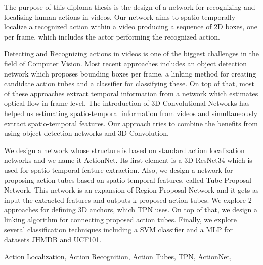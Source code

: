 \documentclass[10pt, twoside, a4paper]{cvsp-thesis}
\newcommand{\en}{\selectlanguage{english}}
\newcommand{\gr}{\selectlanguage{greek}}
\begin{document}
\en
\begin{abstracteng}

  The purpose of this diploma thesis is the design of a network for recognizing and localising human actions in videos.
  Our network aims to spatio-temporally localize a recognized action within a video
  producing a sequence of 2D boxes, one per frame, which includes the actor
  performing the recognized action. \par

  Detecting and Recognizing actions in videos is one of the biggest
  challenges in the field of Computer Vision. Most recent approaches
  includes an object detection network which proposes bounding boxes
  per frame, a linking method for creating candidate action tubes and
  a classifier for classifying these. On top of that, most of these
  approaches extract temporal information from a network which
  estimates optical flow in frame level. The introduction of 3D
  Convolutional Networks has helped us estimating spatio-temporal
  information from videos and simultaneously extract spatio-temporal
  features. Our approach tries to combine the benefits from using
  object detection networks and 3D Convolution.\par

  We design a network whose structure is based on standard action localization networks and we name it ActionNet. Its first
  element is a 3D ResNet34 which is used for spatio-temporal feature extraction. Also,
  we design a network for proposing action tubes based on spatio-temporal features, called Tube Proposal Network.
  This network is an  expansion of Region Proposal Network and it gets as input the extracted features and
  outputs k-proposed action tubes.
  We explore 2 approaches for  defining 3D anchors, which TPN uses. On top of that,
  we design a linking algorithm for
  connecting proposed action tubes. Finally, we explore several classification techniques
  including a SVM classifier and a MLP for datasets JHMDB and UCF101.

\begin{keywordseng}
Action Localization, Action Recognition, Action Tubes, TPN, ActionNet,
\end{keywordseng}

\end{abstracteng}

\mainmatter
\gr
{}
\tableofcontents
{}
\listoftables
{}
\listoffigures
\en



% 
% 
% 
% 
% 
% 
% 
% 
% 
% 



\en
{}
\printbibliography

\end{document}
